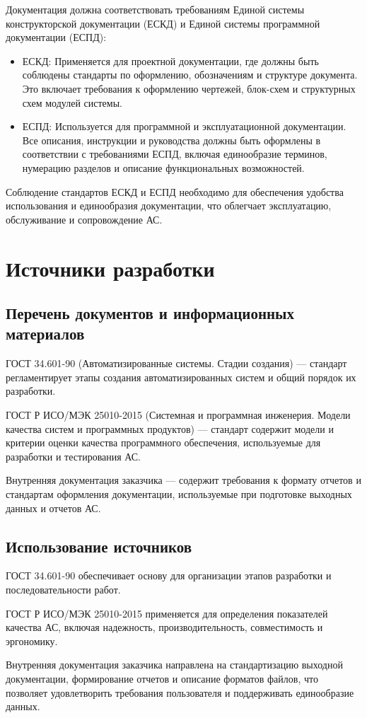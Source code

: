 Документация должна соответствовать требованиям
Единой системы конструкторской документации (ЕСКД)
и Единой системы программной документации (ЕСПД):

\begin{itemize}
	\item ЕСКД: Применяется для проектной документации,
		где должны быть соблюдены стандарты по оформлению, обозначениям
		и структуре документа.
		Это включает требования к оформлению чертежей,
		блок-схем и структурных схем модулей системы.
	\item ЕСПД: Используется для программной и эксплуатационной документации.
		Все описания, инструкции и руководства должны быть оформлены
		в соответствии с требованиями ЕСПД, включая единообразие терминов,
		нумерацию разделов и описание функциональных возможностей.
\end{itemize}

Соблюдение стандартов ЕСКД и ЕСПД необходимо
для обеспечения удобства использования и единообразия документации,
что облегчает эксплуатацию, обслуживание и сопровождение АС.

\section{Источники разработки}

\subsection{Перечень документов и информационных материалов}

ГОСТ 34.601-90 (Автоматизированные системы. Стадии создания)
--- стандарт регламентирует этапы создания автоматизированных систем
и общий порядок их разработки.

ГОСТ Р ИСО/МЭК 25010-2015 (Системная и программная инженерия.
Модели качества систем и программных продуктов) --- стандарт содержит модели
и критерии оценки качества программного обеспечения,
используемые для разработки и тестирования АС.


Внутренняя документация заказчика --- содержит требования к формату отчетов
и стандартам оформления документации,
используемые при подготовке выходных данных и отчетов АС.

\subsection{Использование источников}

ГОСТ 34.601-90 обеспечивает основу для организации этапов разработки
и последовательности работ.

ГОСТ Р ИСО/МЭК 25010-2015 применяется
для определения показателей качества АС, включая надежность,
производительность, совместимость и эргономику.


Внутренняя документация заказчика направлена
на стандартизацию выходной документации,
формирование отчетов и описание форматов файлов,
что позволяет удовлетворить требования пользователя
и поддерживать единообразие данных.

